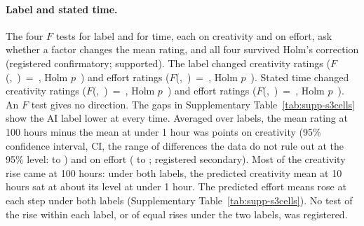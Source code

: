 \paragraph*{Label and stated time.}
The four $F$ tests for label and for time, each on creativity and on effort, ask whether a factor changes the mean rating, and all four survived Holm's correction (registered confirmatory; supported). The label changed creativity ratings ($F$(\SThreeCreatSourceDfNum,~\SThreeCreatSourceDfDen)~=~\SThreeCreatSourceF, Holm $p$~\SThreeCreatSourcePHolm) and effort ratings ($F$(\SThreeEffSourceDfNum,~\SThreeEffSourceDfDen)~=~\SThreeEffSourceF, Holm $p$~\SThreeEffSourcePHolm). Stated time changed creativity ratings ($F$(\SThreeCreatTimeDfNum,~\SThreeCreatTimeDfDen)~=~\SThreeCreatTimeF, Holm $p$~\SThreeCreatTimePHolm) and effort ratings ($F$(\SThreeEffTimeDfNum,~\SThreeEffTimeDfDen)~=~\SThreeEffTimeF, Holm $p$~\SThreeEffTimePHolm). An $F$ test gives no direction. The gaps in Supplementary Table~\ref{tab:supp-s3cells} show the AI label lower at every time. Averaged over labels, the mean rating at 100 hours minus the mean at under 1 hour was \SThreeCreatTimeContrastEst{} points on creativity (95\% confidence interval, CI, the range of differences the data do not rule out at the 95\% level: \SThreeCreatTimeContrastLo{} to \SThreeCreatTimeContrastHi) and \SThreeEffTimeContrastEst{} on effort (\SThreeEffTimeContrastLo{} to \SThreeEffTimeContrastHi; registered secondary). Most of the creativity rise came at 100 hours: under both labels, the predicted creativity mean at 10 hours sat at about its level at under 1 hour. The predicted effort means rose at each step under both labels (Supplementary Table~\ref{tab:supp-s3cells}). No test of the rise within each label, or of equal rises under the two labels, was registered.

